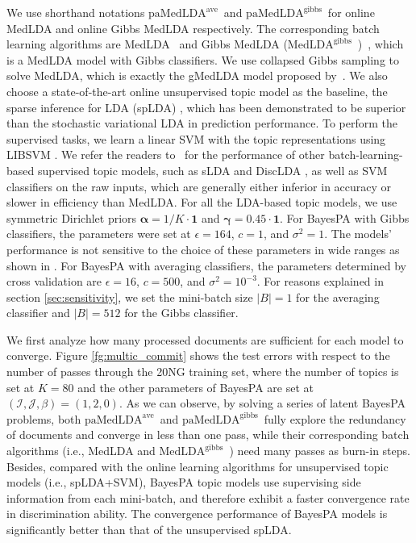 \documentclass[twoside,11pt]{article}
\newcommand\paMedLDAave{$\text{paMedLDA}^{\text{ave}}$~}
\newcommand\paMedLDAgibbs{$\text{paMedLDA}^{\text{gibbs}}$~}
\newcommand\MedLDAgibbs{$\text{MedLDA}^{\text{gibbs}}$~}
\begin{document}
We use shorthand notations \paMedLDAave and \paMedLDAgibbs for online MedLDA and online Gibbs MedLDA respectively. The corresponding batch learning algorithms are MedLDA~\citep{zhu2012medlda} and Gibbs MedLDA (\MedLDAgibbs)~\citep{zhugibbs2013}, which is a MedLDA model with Gibbs classifiers. We use collapsed Gibbs sampling to solve MedLDA, which is exactly the gMedLDA model proposed by~\cite{jiang2012monte}. We also choose a state-of-the-art online unsupervised topic model as the baseline, the sparse inference for LDA (spLDA) \citep{mimno2012sparse}, which has been demonstrated to be superior than the stochastic variational LDA \citep{hoffman2013stochastic} in prediction performance. To perform the supervised tasks, we learn a linear SVM with the topic representations using LIBSVM \citep{chang2011libsvm}. We refer the readers to~\citep{zhu2012medlda} for the performance of other batch-learning-based supervised topic models, such as sLDA \citep{blei2010supervised} and DiscLDA \citep{lacoste2008disclda}, as well as SVM classifiers on the raw inputs, which are generally either inferior in accuracy or slower in efficiency than MedLDA. For all the LDA-based topic models, we use symmetric Dirichlet priors $\bm{\alpha} = 1/K \cdot \bm{1}$ and $\bm{\gamma} = 0.45 \cdot \bm{1}$. For BayesPA with Gibbs classifiers, the parameters were set at $\epsilon = 164$, $c = 1$, and $\sigma^2 = 1$. The models' performance is not sensitive to the choice of these parameters in wide ranges as shown in \cite{zhugibbs2013}. For BayesPA with averaging classifiers, the parameters determined by cross validation are $\epsilon = 16$, $c = 500$, and $\sigma^2 = 10^{-3}$. For reasons explained in section \ref{sec:sensitivity}, we set the mini-batch size $|B| = 1$ for the averaging classifier and $|B| = 512$ for the Gibbs classifier.

We first analyze how many processed documents are sufficient for each model to converge. Figure \ref{fg:multic_commit} shows the test errors with respect to the number of passes through the 20NG training set, where the number of topics is set at $K = 80$ and the other parameters of BayesPA are set at $(\mathcal{I}, \mathcal{J}, \beta) = (1, 2, 0)$. As we can observe, by solving a series of latent BayesPA problems, both \paMedLDAave and \paMedLDAgibbs fully explore the redundancy of documents and converge in  less than one pass, while their corresponding batch algorithms (i.e., MedLDA and \MedLDAgibbs) need many passes as burn-in steps. Besides, compared with the online learning algorithms for unsupervised topic models (i.e., spLDA+SVM), BayesPA topic models use supervising side information from each mini-batch, and therefore exhibit a faster convergence rate in discrimination ability. The convergence performance of BayesPA models is significantly better than that of the unsupervised spLDA.
\end{document}

